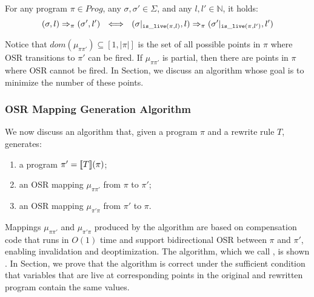 \begin{lemma}
\label{le:only-live-count}
For any program $\pi\in Prog$, any $\sigma,\sigma'\in\Sigma$, and any $l,l'\in \mathbb{N}$, it holds: 
$$
(\sigma,l)\Rightarrow_{\pi}(\sigma',l') ~~ \Longleftrightarrow ~~ (\sigma\vert_{\text{${\tt is\_live}$}(\pi,l)},l)\Rightarrow_{\pi}(\sigma'\vert_{\text{${\tt is\_live}$}(\pi,l')},l')
$$
\end{lemma}

\noindent Notice that $dom(\mu_{\pi\pi'})\subseteq [1,|\pi|]$ is the set of all possible points in $\pi$ where OSR transitions to $\pi'$ can be fired. If $\mu_{\pi\pi'}$ is partial, then there are points in $\pi$ where OSR cannot be fired. In Section\missing, we discuss an algorithm whose goal is to minimize the number of these points.


\subsubsection{OSR Mapping Generation Algorithm}
We now discuss an algorithm that, given a program $\pi$ and a rewrite rule $T$, generates:
\begin{enumerate}[itemsep=0pt,parsep=3pt]
 \item a program $\pi'=[\![T]\!](\pi)$;
 \item an OSR mapping $\mu_{\pi\pi'}$ from $\pi$ to $\pi'$;
 \item an OSR mapping $\mu_{\pi'\pi}$ from $\pi'$ to $\pi$.
\end{enumerate}

\noindent Mappings $\mu_{\pi\pi'}$ and $\mu_{\pi'\pi}$ produced by the algorithm are based on compensation code that runs in $O(1)$ time and support bidirectional OSR between $\pi$ and $\pi'$, enabling invalidation and deoptimization. The algorithm, which we call \osrtrans, is shown . In Section\missing, we prove that the algorithm is correct under the sufficient condition that variables that are live at corresponding points in the original and rewritten program contain the same values.

